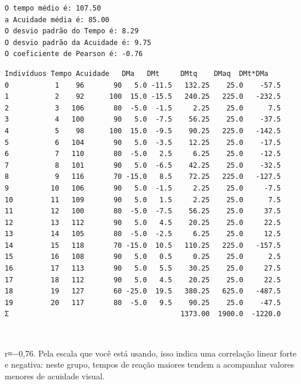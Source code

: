 \documentclass[11pt]{article}
\begin{document}
    \begin{Verbatim}[commandchars=\\\{\}]
O tempo médio é: 107.50
a Acuidade média é: 85.00
O desvio padrão do Tempo é: 8.29
O desvio padrão da Acuidade é: 9.75
O coeficiente de Pearson é: -0.76
    \end{Verbatim}

    
    \begin{Verbatim}[commandchars=\\\{\}]
   Indivíduos Tempo Acuidade   DMa   DMt     DMtq    DMaq  DMt*DMa
0           1    96       90   5.0 -11.5   132.25    25.0    -57.5
1           2    92      100  15.0 -15.5   240.25   225.0   -232.5
2           3   106       80  -5.0  -1.5     2.25    25.0      7.5
3           4   100       90   5.0  -7.5    56.25    25.0    -37.5
4           5    98      100  15.0  -9.5    90.25   225.0   -142.5
5           6   104       90   5.0  -3.5    12.25    25.0    -17.5
6           7   110       80  -5.0   2.5     6.25    25.0    -12.5
7           8   101       90   5.0  -6.5    42.25    25.0    -32.5
8           9   116       70 -15.0   8.5    72.25   225.0   -127.5
9          10   106       90   5.0  -1.5     2.25    25.0     -7.5
10         11   109       90   5.0   1.5     2.25    25.0      7.5
11         12   100       80  -5.0  -7.5    56.25    25.0     37.5
12         13   112       90   5.0   4.5    20.25    25.0     22.5
13         14   105       80  -5.0  -2.5     6.25    25.0     12.5
14         15   118       70 -15.0  10.5   110.25   225.0   -157.5
15         16   108       90   5.0   0.5     0.25    25.0      2.5
16         17   113       90   5.0   5.5    30.25    25.0     27.5
17         18   112       90   5.0   4.5    20.25    25.0     22.5
18         19   127       60 -25.0  19.5   380.25   625.0   -487.5
19         20   117       80  -5.0   9.5    90.25    25.0    -47.5
Σ                                         1373.00  1900.0  -1220.0
    \end{Verbatim}

    
    \begin{center}
    \end{center}
    { \hspace*{\fill} \\}
    
    r≈−0,76. Pela escala que você está usando, isso indica uma correlação
linear forte e negativa: neste grupo, tempos de reação maiores tendem a
acompanhar valores menores de acuidade visual.
\end{document}
